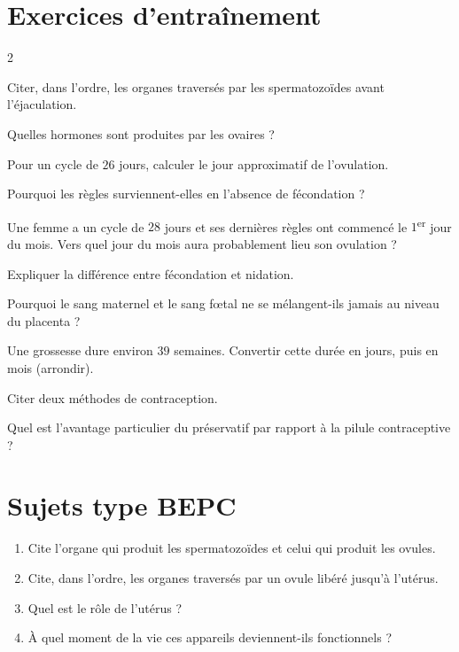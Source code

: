 \section{Exercices d'entraînement}
\begin{multicols}{2}

\exo{} Citer, dans l'ordre, les organes traversés par les spermatozoïdes avant
l'éjaculation.

\exo{} Quelles hormones sont produites par les ovaires ?

\exo{} Pour un cycle de $26$ jours, calculer le jour approximatif de
l'ovulation.

\exo{} Pourquoi les règles surviennent-elles en l'absence de fécondation ?

\exo{} Une femme a un cycle de $28$ jours et ses dernières règles ont commencé
le $1$\textsuperscript{er} jour du mois. Vers quel jour du mois aura probablement lieu son
ovulation ?

\exo{} Expliquer la différence entre fécondation et nidation.

\exo{} Pourquoi le sang maternel et le sang fœtal ne se mélangent-ils jamais au
niveau du placenta ?

\exo{} Une grossesse dure environ $39$ semaines. Convertir cette durée en jours,
puis en mois (arrondir).

\exo{} Citer deux méthodes de contraception.

\exo{} Quel est l'avantage particulier du préservatif par rapport à la pilule
contraceptive ?

\end{multicols}

\section{Sujets type BEPC}

\begin{enumerate}[label=\arabic*)]
\item Cite l'organe qui produit les spermatozoïdes et celui qui produit les ovules.
\item Cite, dans l'ordre, les organes traversés par un ovule libéré jusqu'à l'utérus.
\item Quel est le rôle de l'utérus ?
\item À quel moment de la vie ces appareils deviennent-ils fonctionnels ?
\end{enumerate}

